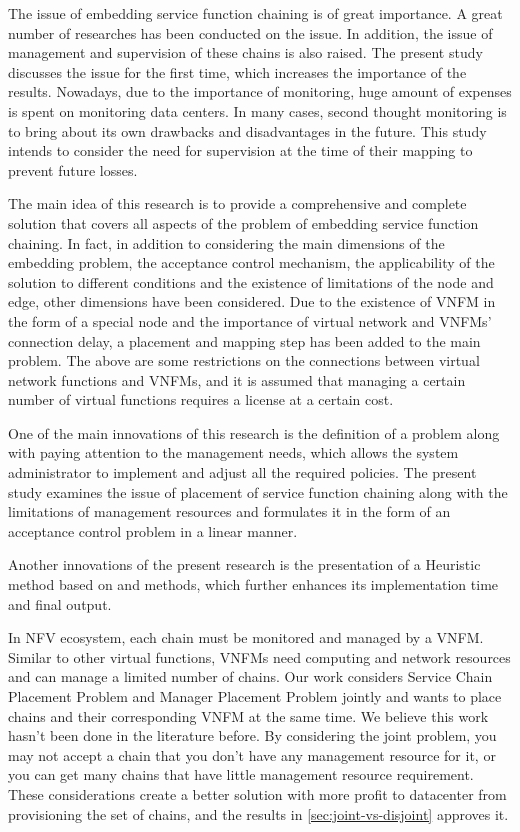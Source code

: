 The issue of embedding service function chaining is of great importance.
A great number of researches has been conducted on the issue.
In addition, the issue of management and supervision of these chains is also raised.
The present study discusses the issue for the first time, which increases the importance of the results.
Nowadays, due to the importance of monitoring, huge amount of expenses is spent on monitoring data centers.
In many cases, second thought monitoring is to bring about its own drawbacks and disadvantages in the future.
This study intends to consider the need for supervision at the time of their mapping to prevent future losses.

The main idea of this research is to provide a comprehensive and complete solution that covers all aspects of the problem of embedding service function chaining.
In fact, in addition to considering the main dimensions of the embedding problem,
the acceptance control mechanism, the applicability of the solution to different conditions
and the existence of limitations of the node and edge, other dimensions have been considered.
Due to the existence of VNFM in the form of a special node and the importance of  virtual network and VNFMs' connection delay, a placement and mapping step has been added to the main problem.
The above are some restrictions on the connections between virtual network functions and VNFMs, and it is assumed that managing a certain number of virtual functions requires a license at a certain cost.

One of the main innovations of this research is the definition of a problem along with paying attention to the management needs, which allows the system administrator to implement and adjust all the required policies.
The present study examines the issue of placement of service function chaining along with the limitations of management resources and formulates it in the form of an acceptance control problem in a linear manner.

Another innovations of the present research is the presentation of a Heuristic method based on \cite{Bari2015} and \cite{AbuLebdeh2017} methods,
which further enhances its implementation time and final output.

In NFV ecosystem, each chain must be monitored and managed by a VNFM. Similar to other virtual functions, VNFMs need computing and network resources and  can manage a limited number of chains.
Our work considers Service Chain Placement Problem and Manager Placement Problem jointly and wants to place chains and their corresponding VNFM at the same time.
We believe this work hasn't been done in the literature before.
By considering the joint problem, you may not accept a chain that you don't have any management resource for it,
or you can get many chains that have little management resource requirement.
These considerations create a better solution with more profit to datacenter from provisioning the set of chains,
and the results in \ref{sec:joint-vs-disjoint} approves it.


